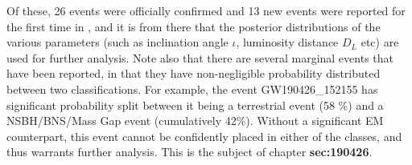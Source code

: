     Of these, 26 events were officially confirmed and 13 new events were reported for
    the first time in \cite{abbott_2020}, and it is from there that the posterior
    distributions of the various parameters (such as inclination angle $\iota$,
    luminosity distance $D_L$ etc) are used for further analysis.  Note also that there
    are several marginal events that have been reported, in that they have
    non-negligible probability distributed between two classifications. For example, the
    event GW190426\_152155 has significant probability split between it being a
    terrestrial event (58 \%) and a NSBH/BNS/Mass Gap event (cumulatively 42\%). Without
    a significant EM counterpart, this event cannot be confidently placed in either of
    the classes, and thus warrants further analysis. This is the subject of chapter
    \textbf{sec:190426}.

